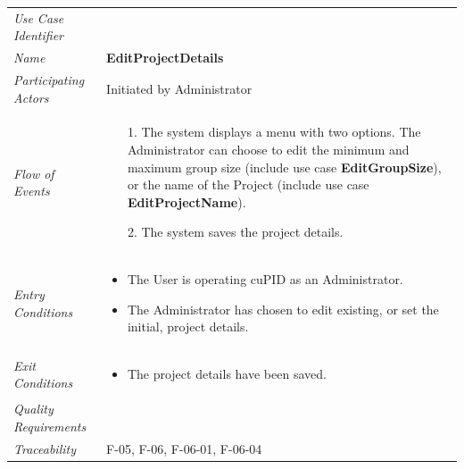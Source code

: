 \documentclass[12pt,letterpaper]{article}
\begin{document}
\begin{center}
	\begin{tabu} to 
		\toprule
		Use Case Identifier &  \\
		Name & {\bf EditProjectDetails} \\
		Participating Actors & Initiated by Administrator \\
		Flow of Events & 
		\begin{minipage}[t]{\linewidth}
		    \begin{enumerate}
			    \item[1.] The system displays a menu with two options. The Administrator can choose to edit the minimum and maximum group size (include use case \textbf{EditGroupSize}), or the name of the Project (include use case \textbf{EditProjectName}).
			    \item[2.] The system saves the project details.
			\end{enumerate}
		\end{minipage} \\

		Entry Conditions &
		\begin{minipage}[t]{\linewidth}
			\begin{itemize}
			    \item The User is operating cuPID as an Administrator.
			    \item The Administrator has chosen to edit existing, or set the initial, project details.
	        \end{itemize}
		\end{minipage} \\

		Exit Conditions &
		\begin{minipage}[t]{\linewidth}
			\begin{itemize}
			    \item The project details have been saved.
	        \end{itemize}
		\end{minipage} \\


		Quality Requirements & \\

		Traceability & F-05, F-06, F-06-01, F-06-04 \\
		\toprule
	\end{tabu}
\end{center}

\newpage{}
\end{document}
